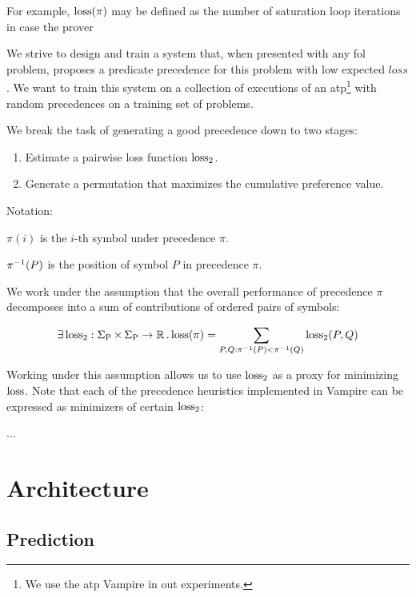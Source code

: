 For example, \(\operatorname{loss}(\pi)\) may be defined as the number of saturation loop iterations in case the prover

We strive to design and train a system that, when presented with any \gls{fol} problem,
proposes a predicate precedence for this problem with low expected \(loss\).
We want to train this system on a collection of executions of an \gls{atp}\footnote{We use the \gls{atp} Vampire in out experiments.} with random precedences on a training set of problems.

We break the task of generating a good precedence down to two stages:

\begin{enumerate}
	\item Estimate a pairwise loss function \(\operatorname{loss}_2\).
	\item Generate a permutation that maximizes the cumulative preference value.
\end{enumerate}

Notation:

\(\pi(i)\) is the \(i\)-th symbol under precedence \(\pi\).

\(\pi^{-1}(P)\) is the position of symbol \(P\) in precedence \(\pi\).

We work under the assumption that the overall performance of precedence \(\pi\) decomposes into a sum of contributions of ordered pairs of symbols:

\begin{align*}
\exists \operatorname{loss}_2 : \operatorname{\Sigma_P} \times \operatorname{\Sigma_P} \rightarrow \operatorname{\mathbb{R}} . \operatorname{loss}(\pi) = \sum_{P, Q: \pi^{-1}(P) < \pi^{-1}(Q)} \operatorname{loss}_2(P, Q)
\end{align*}

Working under this assumption allows us to use \(\operatorname{loss}_2\) as a proxy for minimizing \(\operatorname{loss}\).
Note that each of the precedence heuristics implemented in Vampire can be expressed as minimizers of certain \(\operatorname{loss}_2\):

...



\section{Architecture}

\subsection{Prediction}

